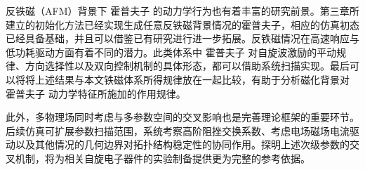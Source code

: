 反铁磁（AFM）背景下 霍普夫子 的动力学行为也有着丰富的研究前景。第三章所建立的初始化方法已经实现生成任意反铁磁背景情况的霍普夫子，相应的仿真初态已经具备基础，并且可以借鉴已有研究进行进一步拓展\cite{zhang2023magnon,pershoguba2021electronic}。反铁磁情况在高速响应与低功耗驱动方面有着不同的潜力。此类体系中 霍普夫子 对自旋波激励的平动规律、方向选择性以及双向控制机制的具体形态，都可以借助系统扫描实现。最后可以将将上述结果与本文铁磁体系所得规律放在一起比较，有助于分析磁化背景对 霍普夫子 动力学特征所施加的作用规律。

此外，多物理场同时考虑与多参数空间的交叉影响也是完善理论框架的重要环节。后续仿真可扩展参数扫描范围，系统考察高阶阻挫交换系数、考虑电场磁场电流驱动以及其他情况的几何边界对拓扑结构稳定性的协同作用。探明上述次级参数的交叉机制，将为相关自旋电子器件的实验制备提供更为完整的参考依据。
